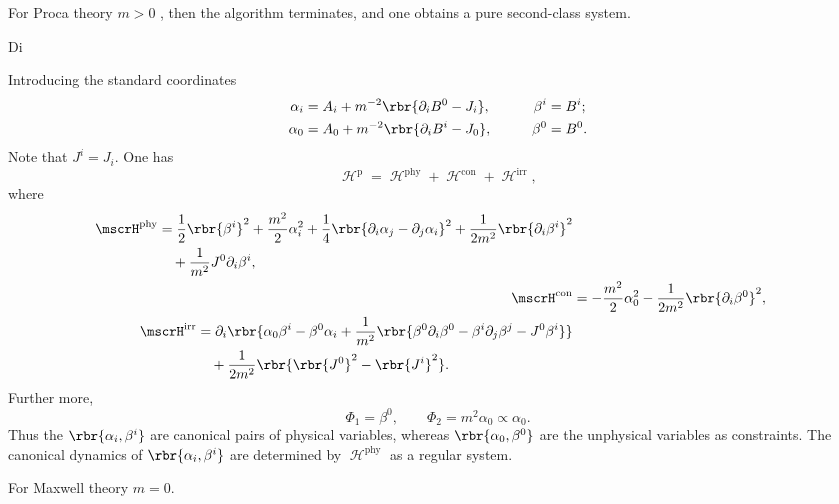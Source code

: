 \documentclass[a4paper,11pt]{article}
\begin{document}
For Proca theory $m > 0$ , then the algorithm terminates, and one obtains a 
pure second-class system.

Di

Introducing the standard coordinates
\begin{alignat}{3}
\alpha_i &= A_i + m^{-2}\rbr{\partial_i B^0 - J_i},&\qquad \beta^i &= B^i; \\
\alpha_0 &= A_0 + m^{-2}\rbr{\partial_i B^i - J_0},&\qquad \beta^0 &= B^0.
\end{alignat}
Note that $J^i = J_i$. One has
\begin{equation}
\mscrH^\text{p} = \mscrH^\text{phy}+\mscrH^\text{con}+\mscrH^\text{irr},
\end{equation}
where
\begin{align}
\begin{split}
\mscrH^\text{phy} &= \frac{1}{2}\rbr{\beta^i}^2 + \frac{m^2}{2}\alpha_i^2 +
\frac{1}{4}\rbr{\partial_i \alpha_j - \partial_j \alpha_i}^2 + 
\frac{1}{2m^2}\rbr{\partial_i \beta^i}^2 \\
&\quad +\frac{1}{m^2} J^0 \partial_i \beta^i,
\end{split}\\
\mscrH^\text{con} &= -\frac{m^2}{2}\alpha_0^2 - \frac{1}{2m^2} 
\rbr{\partial_i \beta^0}^2,\\
\begin{split}
\mscrH^\text{irr} &= \partial_i\rbr{\alpha_0\beta^i - \beta^0\alpha_i + 
\frac{1}{m^2}\rbr{\beta^0\partial_i\beta^0 - 
\beta^i\partial_j\beta^j - J^0 \beta^i}} \\
&\quad + \frac{1}{2m^2}\rbr{\rbr{J^0}^2 - \rbr{J^i}^2}.
\end{split}
\end{align}
Further more,
\begin{equation}
\Phi_1 = \beta^0,\qquad\Phi_2 = m^2\alpha_0 \propto \alpha_0.
\end{equation}
Thus the $\rbr{\alpha_i, \beta^i}$ are canonical pairs of physical variables, 
whereas $\rbr{\alpha_0, \beta^0}$ are the unphysical variables as constraints. 
The canonical dynamics of $\rbr{\alpha_i, \beta^i}$ are determined by 
$\mscrH^\text{phy}$ as a regular system.


For Maxwell theory $m = 0$.









\end{document}
